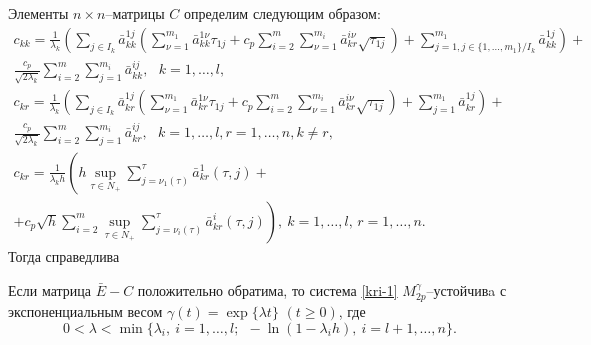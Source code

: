 Элементы $n\times n$--матрицы $C$ определим следующим образом:
$$
\begin{array}{crl}
c_{kk}  = \frac{1}{\lambda _k }\left(\sum \limits_{j \in I_k}\bar
a^{1j}_{kk}\left(\sum \limits_{\nu=1}^{m_1}\bar a^{1\nu}_{kk}\tau
_{1j}  + c_p\sum \limits_{i=2}^m \sum \limits_{\nu=1}^{m_i}\bar
a^{i\nu}_{kr}\sqrt{\tau _{1j}}\right) + \sum \limits_{j=1, j \in
\{1,\dots,m_1\}/ I_k}^{m_1} \bar a^{1j}_{kk}\right)+ \\
\frac{c_p}{\sqrt{2\lambda_k }}\sum
\limits_{i=2}^m \sum \limits_{j=1}^{m_i}\bar a^{ij}_{kk}, \ \ \ k = 1,\dots,l,\\
c_{kr} = \frac{1}{\lambda _k }\left(\sum \limits_{j \in I_k}\bar
a^{1j}_{kr}\left(\sum \limits_{\nu=1}^{m_1}\bar a^{1\nu}_{kr} \tau
_{1j} +  c_p\sum \limits_{i=2}^m \sum \limits_{\nu=1}^{m_i}\bar
a^{i\nu}_{kr}\sqrt{\tau _{1j}}\right) + \sum \limits_{j=1}^{m_1}
\bar a^{1j}_{kr}\right)+ \\
\frac{c_p}{\sqrt{2\lambda_k }}\sum \limits_{i=2}^m \sum
\limits_{j=1}^{m_i}\bar a^{ij}_{kr}, \ \ \ k =
1,\dots,l,r = 1, \dots, n, k \neq r,\\
 c_{kr} = \frac{1}{\lambda_kh}
\left(h\mathrel {\mathop {\sup} \limits _{\tau \in N_+}}\sum \limits
_{j=\nu _1 (\tau)}^{\tau}\bar a^{1}_{kr}(\tau,j) +
\right. \\ \left. + 
c_p\sqrt{h}\sum
\limits _{i=2}^{m}\mathrel {\mathop {\sup} \limits _{\tau \in
N_+}}\sum \limits _{j=\nu _i (\tau)}^{\tau}\bar
a^{i}_{kr}(\tau,j)\right), \ k = 1,\dots,l,\, r  = 1,\dots,n.
\end{array}
$$
Тогда справедлива

\begin{theorem}\label{kri-th5}
Если матрица $\bar E - C$ положительно
обратима, то система \eqref{kri-1} $M_{2p}^\gamma $--устой\-чи\-вa с
экспоненциальным весом $\gamma (t) = \exp \{\lambda t\} \,\, (t \geq
0)$, где \begin{equation}\label{kri-9}0<\lambda < \min \{\lambda _i, \ i = 1, \dots,l; \ \ -\ln
(1-\lambda _ih), \ i = l+1, \dots, n \}.
\end{equation}
\end{theorem}

